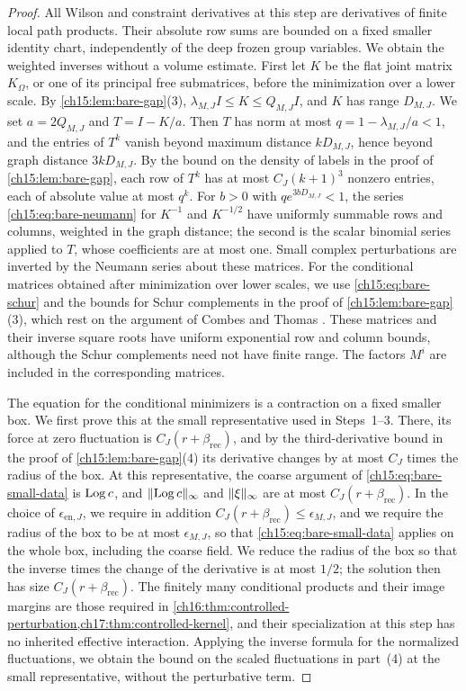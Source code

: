\begin{proof}
All Wilson and constraint derivatives at this step are derivatives of finite local path products. Their absolute row sums are bounded on a fixed smaller identity chart, independently of the deep frozen group variables. We obtain the weighted inverses without a volume estimate. First let $K$ be the flat joint matrix $K_\Omega$, or one of its principal free submatrices, before the minimization over a lower scale. By \cref{ch15:lem:bare-gap}(3), $\lambda_{M,J}I\le K\le Q_{M,J}I$, and $K$ has range $D_{M,J}$. We set $a=2Q_{M,J}$ and $T=I-K/a$. Then $T$ has norm at most $q=1-\lambda_{M,J}/a<1$, and the entries of $T^k$ vanish beyond maximum distance $kD_{M,J}$, hence beyond graph distance $3kD_{M,J}$. By the bound on the density of labels in the proof of \cref{ch15:lem:bare-gap}, each row of $T^k$ has at most $C_J(k+1)^3$ nonzero entries, each of absolute value at most $q^k$. For $b>0$ with $qe^{3bD_{M,J}}<1$, the series \eqref{ch15:eq:bare-neumann} for $K^{-1}$ and $K^{-1/2}$ have uniformly summable rows and columns, weighted in the graph distance; the second is the scalar binomial series applied to $T$, whose coefficients are at most one. Small complex perturbations are inverted by the Neumann series about these matrices. For the conditional matrices obtained after minimization over lower scales, we use \eqref{ch15:eq:bare-schur} and the bounds for Schur complements in the proof of \cref{ch15:lem:bare-gap}(3), which rest on the argument of Combes and Thomas \cite{CombesThomas1973}. These matrices and their inverse square roots have uniform exponential row and column bounds, although the Schur complements need not have finite range. The factors $M^i$ are included in the corresponding matrices.

The equation for the conditional minimizers is a contraction on a fixed smaller box. We first prove this at the small representative used in Steps~1--3. There, its force at zero fluctuation is $C_J(r+\beta_{\mathrm{rec}})$, and by the third-derivative bound in the proof of \cref{ch15:lem:bare-gap}(4) its derivative changes by at most $C_J$ times the radius of the box. At this representative, the coarse argument of \eqref{ch15:eq:bare-small-data} is $\operatorname{Log} c$, and $\lVert \operatorname{Log} c\rVert_\infty$ and $\lVert \xi\rVert_\infty$ are at most $C_J(r+\beta_{\mathrm{rec}})$. In the choice of $\epsilon_{\mathrm{en},J}$, we require in addition $C_J(r+\beta_{\mathrm{rec}})\le\epsilon_{M,J}$, and we require the radius of the box to be at most $\epsilon_{M,J}$, so that \eqref{ch15:eq:bare-small-data} applies on the whole box, including the coarse field. We reduce the radius of the box so that the inverse times the change of the derivative is at most $1/2$; the solution then has size $C_J(r+\beta_{\mathrm{rec}})$. The finitely many conditional products and their image margins are those required in \cref{ch16:thm:controlled-perturbation,ch17:thm:controlled-kernel}, and their specialization at this step has no inherited effective interaction. Applying the inverse formula for the normalized fluctuations, we obtain the bound on the scaled fluctuations in part~(4) at the small representative, without the perturbative term.


\end{proof}
